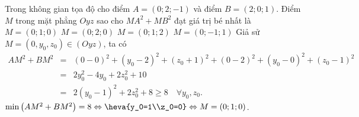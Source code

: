 \begin{vd}%
	Trong không gian tọa độ cho điểm $A = (0;2;-1)$ và điểm $B=(2;0;1)$. Điểm $M$ trong mặt phẳng $Oyz$ sao cho $MA^2 + MB^2$ đạt giá trị bé nhất là
	\choice
	{\True $M = (0;1;0)$}
	{$M = (0;2;0)$}
	{$M = (0;1;2)$}
	{$M = (0;-1;1)$}
	\loigiai
	{Giả sử $M=(0,y_0,z_0)\in (Oyz)$, ta có
		\allowdisplaybreaks
		\begin{eqnarray*}
			AM^2 + BM^2 &=& \left(0-0\right)^2+ \left(y_0-2\right)^2 + \left(z_0+1\right)^2 + \left(0-2\right)^2+ \left(y_0-0\right)^2 + \left(z_0-1\right)^2 \\
			&=& 2 y_0^2-4 y_0+2 z_0^2 +10\\
			&=& 2 (y_0-1)^2+2 z_0^2 +8 \geq 8\quad \forall y_0,z_0.
		\end{eqnarray*}
		$\min\left(AM^2 + BM^2\right) = 8\Leftrightarrow \heva{y_0=1\\z_0=0} \Leftrightarrow M = (0;1;0)$.
	}
\end{vd}
